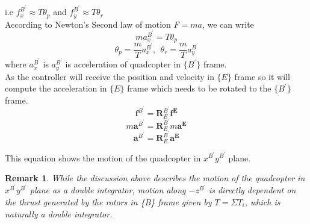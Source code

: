 \documentclass[letterpaper, 10 pt, conference]{ieeeconf}
\newtheorem{rem}{Remark}
\begin{document}
i.e $f_{x}^{B^{\prime}} \approx T\theta_{p}$ and $f_{y}^{B^{\prime}} \approx T\theta_{r}$ \\
According to Newton's Second law of motion $F=ma$, we can write
\begin{equation*}
    ma_{x}^{B^{\prime}} = T\theta_{p}
\end{equation*}
\begin{equation*}
    \theta_{p} = \dfrac{m}{T}a_{x}^{B^{\prime}},~~\theta_{r} = \dfrac{m}{T}a_{y}^{B^{\prime}}
\end{equation*}
where $a_{x}^{B^{\prime}}$ is  $a_{y}^{B^{\prime}}$ is acceleration of quadcopter in $\{B^{\prime}\}$ frame.\\
As the controller will receive the position and velocity in $\{E\}$ frame so it will compute the acceleration in $\{E\}$ frame which needs to be rotated to the $\{B^{\prime}\}$ frame.
\begin{equation*}
    \mathbf{f}^{B^{\prime}} = \mathbf{R}_{E}^{B^{\prime}}\mathbf{f^{E}}
\end{equation*}
\begin{equation*}
    m\mathbf{a}^{B^{\prime}} = \mathbf{R}_{E}^{B^{\prime}}m\mathbf{a^{E}}
\end{equation*}
\begin{equation*}
    \mathbf{a}^{B^{\prime}} = \mathbf{R}_{E}^{B^{\prime}}\mathbf{a^{E}}
\end{equation*}

This equation shows the motion of the quadcopter in $x^{B^{\prime}}y^{B^{\prime}}$ plane.

\begin{rem}
    While the discussion above describes the motion of the quadcopter in $x^{B^{\prime}}y^{B^{\prime}}$ plane as a double integrator, motion along $-z^{B^\prime}$ is directly dependent on the thrust generated by the rotors in \{B\} frame given by $T = \Sigma T_{i}$, which is naturally a double integrator.
\end{rem}
\end{document}
